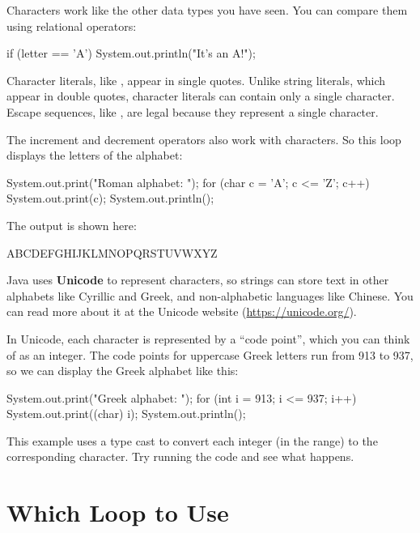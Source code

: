 Characters work like the other data types you have seen.
You can compare them using relational operators:

\begin{code}
if (letter == 'A') {
    System.out.println("It's an A!");
}
\end{code}


Character literals, like , appear in single quotes.
Unlike string literals, which appear in double quotes, character literals can contain only a single character.
Escape sequences, like , are legal because they represent a single character.

The increment and decrement operators also work with characters.
So this loop displays the letters of the alphabet:

\begin{code}
System.out.print("Roman alphabet: ");
for (char c = 'A'; c <= 'Z'; c++) {
    System.out.print(c);
}
System.out.println();
\end{code}

The output is shown here:

\begin{stdout}
ABCDEFGHIJKLMNOPQRSTUVWXYZ
\end{stdout}


Java uses {\bf Unicode} to represent characters, so strings can store text in other alphabets like Cyrillic and Greek, and non-alphabetic languages like Chinese.
You can read more about it at the Unicode website (\url{https://unicode.org/}).

In Unicode, each character is represented by a ``code point'', which you can think of as an integer.
The code points for uppercase Greek letters run from 913 to 937, so we can display the Greek alphabet like this:

\begin{code}
System.out.print("Greek alphabet: ");
for (int i = 913; i <= 937; i++) {
    System.out.print((char) i);
}
System.out.println();
\end{code}

This example uses a type cast to convert each integer (in the range) to the corresponding character.
Try running the code and see what happens.


\section{Which Loop to Use}

